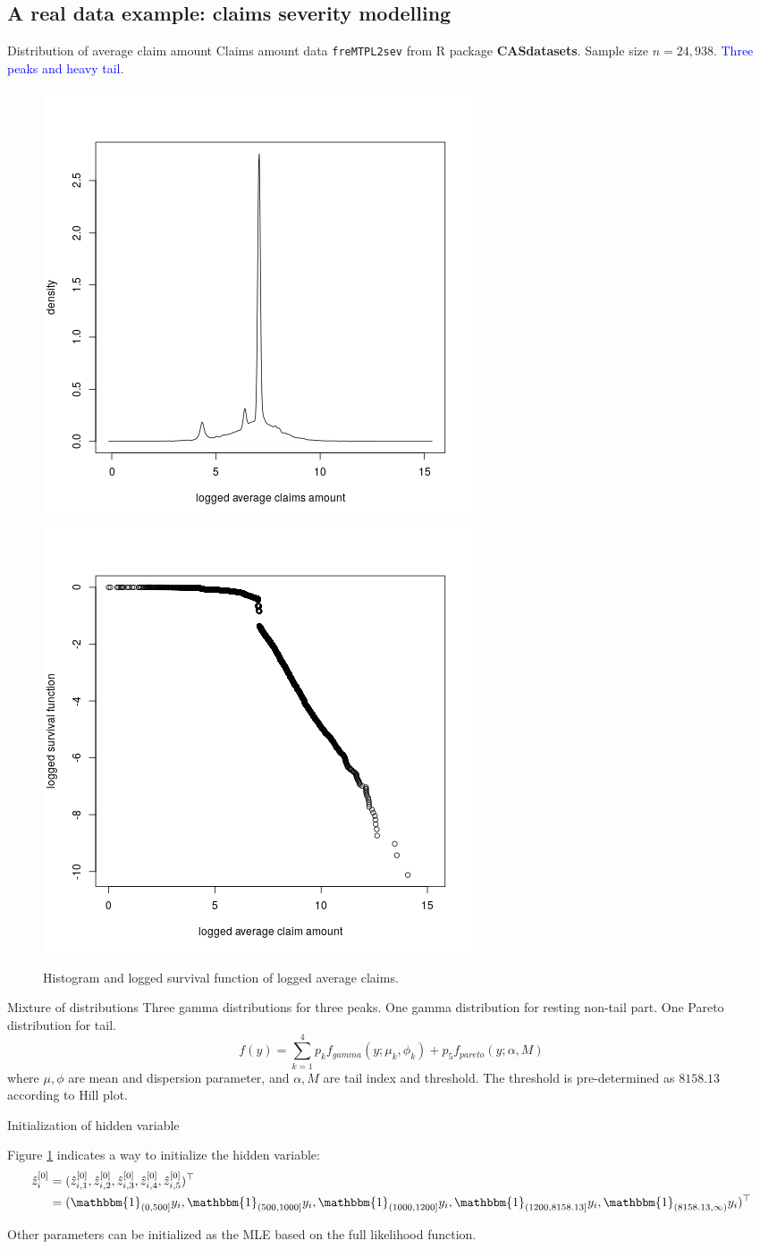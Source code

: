 \documentclass[professionalfont]{beamer}
\newcommand{\blue}[1]{\textcolor{blue}{#1}}
\begin{document}
\subsection{A real data example: claims severity modelling}
\begin{frame}{Distribution of average claim amount}
Claims amount data {\tt freMTPL2sev} from R package {\bf CASdatasets}. Sample size $n=24,938$. \blue{Three peaks and heavy tail}.
\begin{figure}[h!]
	\centering
	\includegraphics[width=0.35\linewidth]{../plots/sev/hist.png}
	\includegraphics[width=0.35\linewidth]{../plots/sev/log-log.png}
	\caption{Histogram and logged survival function of logged average claims.}\label{tail}
\end{figure} 
\end{frame}

\begin{frame}{Mixture of distributions}
Three gamma distributions for three peaks. One gamma distribution for resting non-tail part. One Pareto distribution for tail.
$$f(y)=\sum_{k=1}^4p_kf_{gamma}(y;\mu_k,\phi_k)+p_5f_{pareto}(y;\alpha,M)$$
where $\mu,\phi$ are mean and dispersion parameter, and $\alpha, M$ are tail index and threshold. The threshold is pre-determined as $8158.13$ according to Hill plot.
\end{frame}

\begin{frame}{Initialization of hidden variable}

Figure \ref{tail} indicates a way to initialize the hidden variable:
\begin{equation}
	\begin{aligned}
		\hat{z}^{[0]}_i&=(\hat{z}^{[0]}_{i,1},\hat{z}^{[0]}_{i,2},\hat{z}^{[0]}_{i,3},\hat{z}^{[0]}_{i,4},\hat{z}^{[0]}_{i,5})^\top\\
		&=(\mathbbm{1}_{(0,500]}y_i,\mathbbm{1}_{(500, 1000]}y_i,\mathbbm{1}_{(1000,1200]}y_i,\mathbbm{1}_{(1200,8158.13]}y_i,\mathbbm{1}_{(8158.13,\infty)}y_i)^\top
	\end{aligned}
\end{equation}

Other parameters can be initialized as the MLE based on the full likelihood function.

\end{frame}
\end{document}
